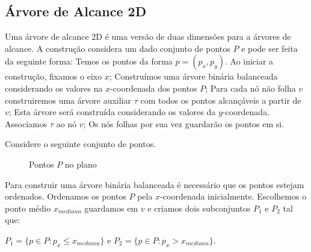 \subsection{Árvore de Alcance 2D}

Uma árvore de alcance 2D é uma versão de duas dimensões para a árvores de alcance. A construção considera
um dado conjunto de pontos $P$ e pode ser feita da seguinte forma:
Temos os pontos da forma $p = (p_x, p_y)$. Ao iniciar a construção, fixamos o eixo $x$;
Construímos uma árvore binária balanceada considerando os valores na $x$-coordenada dos pontos $P$;
Para cada nó não folha $v$ construiremos uma árvore auxiliar $\tau$ com todos os pontos alcançáveis 
a partir de $v$; Esta árvore será construída considerando os valores da $y$-coordenada. Associamos 
$\tau$ ao nó $v$; Os nós folhas por sua vez guardarão os pontos em si.

Considere o seguinte conjunto de pontos.
\begin{figure}[H]

\caption{Pontos $P$ no plano}
\end{figure}

Para construir uma árvore binária balanceada é necessário que os pontos estejam ordenados.
Ordenamos os pontos $P$ pela $x$-coordenada inicialmente. Escolhemos o ponto médio $x_{mediana}$ guardamos
em $v$ e criamos dois subconjuntos $P_1$ e $P_2$ tal que:

    $P_1 = \{p \in P : p_x \leq x_{mediana}\}$ e $P_2 = \{p \in P : p_x > x_{mediana}\}$.

